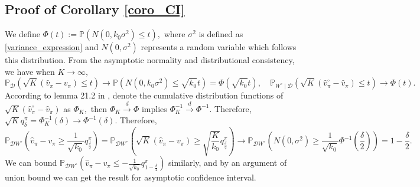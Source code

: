 \documentclass{article}
\numberwithin{equation}{section}
\theoremstyle{plain}
\theoremstyle{definition}
\theoremstyle{remark}
\begin{document}
\subsection{Proof of Corollary \ref{coro_CI}}
We define $\Phi(t) := \mathbb{P}\left(N(0,k_0 \sigma^2) \leq t\right),$ where $\sigma^2$ is defined as \eqref{variance_expression} and $N(0,\sigma^2)$ represents a random variable which follows this distribution. From the asymptotic normality and distributional consistency, we have when $K \to \infty,$
\begin{equation*}
    \mathbb{P}_{\mathcal{D}} \left(\sqrt{K}\left(\widehat{v}_{\pi} - v_{\pi}\right) \leq t \right) \to \mathbb{P}\left(N(0,k_0\sigma^2) \leq \sqrt{k_0} t\right) = \Phi(\sqrt{k_0} t), \quad \mathbb{P}_{W^\circ \mid \mathcal{D}} \left(\sqrt{K}\left(\widehat{v}^\circ_{\pi} - \widehat{v}_{\pi}\right) \leq t\right) \to \Phi\left(t\right).
\end{equation*}
According to lemma 21.2 in \citep{van}, denote the cumulative distribution functions of $\sqrt{K}\left(\widehat{v}_{\pi}^\circ - \widehat{v}_{\pi}\right)$ as $\Phi_K,$ then $\Phi_K \stackrel{d}{\longrightarrow} \Phi$ implies $\Phi_K^{-1} \stackrel{d}{\longrightarrow} \Phi^{-1}.$ Therefore, $\sqrt{K} q_{\delta}^{\pi} = \Phi_K^{-1}\left(\delta\right) \to \Phi^{-1}\left(\delta\right).$ Therefore,
\begin{equation*}
    \mathbb{P}_{\mathcal{D}W^\circ}\left(\widehat{v}_{\pi} - v_{\pi} \geq \frac{1}{\sqrt{k_0}} q_{\frac{\delta}{2}}^{\pi}\right) = \mathbb{P}_{\mathcal{D}W^\circ}\left(\sqrt{K}\left(\widehat{v}_{\pi} - v_{\pi}\right) \geq \sqrt{\frac{K}{k_0}} q_{\frac{\delta}{2}}^{\pi}\right) \to \mathbb{P}_{\mathcal{D}W^\circ}\left(N\left(0,\sigma^2\right) \geq \frac{1}{\sqrt{k_0}}\Phi^{-1}\left(\frac{\delta}{2}\right)\right) = 1 - \frac{\delta}{2}.
\end{equation*}
We can bound $\mathbb{P}_{\mathcal{D}W^\circ} \left( \widehat{v}_{\pi} - v_{\pi} \leq - \frac{1}{\sqrt{k_0}} q_{1 - \frac{\delta}{2}}^{\pi}\right)$ similarly, and by an argument of union bound we can get the result for asymptotic confidence interval.
\end{document}
